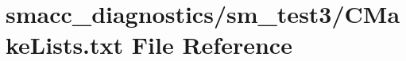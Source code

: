 \hypertarget{diagnostics_2sm__test3_2CMakeLists_8txt}{}\section{smacc\+\_\+diagnostics/sm\+\_\+test3/\+C\+Make\+Lists.txt File Reference}
\label{diagnostics_2sm__test3_2CMakeLists_8txt}
